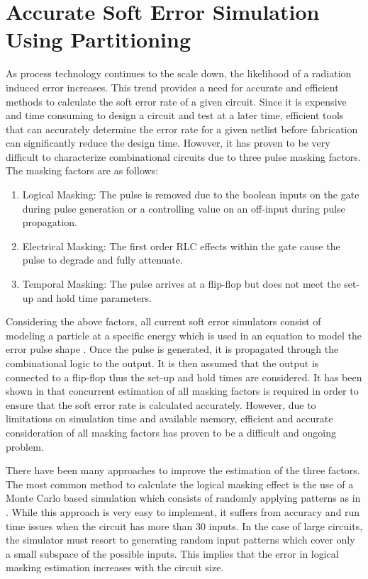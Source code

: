 \chapter{Accurate Soft Error Simulation Using Partitioning} \label{ch3}

As process technology continues to the scale down, the likelihood of a radiation induced error increases. This trend provides a need for accurate and efficient methods to calculate the soft error rate of a given circuit. Since it is expensive and time consuming to design a circuit and test at a later time, efficient tools that can accurately determine the error rate for a given netlist before fabrication can significantly reduce the design time. However, it has proven to be very difficult to characterize combinational circuits due to three pulse masking factors. The masking factors are as follows:

\begin{enumerate}
	\item Logical Masking: The pulse is removed due to the boolean inputs on the gate during pulse generation or a controlling value on an off-input during pulse propagation.
	
	\item Electrical Masking: The first order RLC effects within the gate cause the pulse to degrade and fully attenuate.
	
	\item Temporal Masking: The pulse arrives at a flip-flop but does not meet the set-up and hold time parameters. 
\end{enumerate}

Considering the above factors, all current soft error simulators consist of modeling a particle at a specific energy which is used in an equation to model the error pulse shape \cite{injeq}. Once the pulse is generated, it is propagated through the combinational logic to the output. It is then assumed that the output is connected to a flip-flop thus the set-up and hold times are considered. It has been shown in \cite{MARS_C,METSys} that concurrent estimation of all masking factors is required in order to ensure that the soft error rate is calculated accurately. However, due to limitations on simulation time and available memory, efficient and accurate consideration of all masking factors has proven to be a difficult and ongoing problem. 

There have been many approaches to improve the estimation of the three factors. The most common method to calculate the logical masking effect is the use of a Monte Carlo based simulation which consists of randomly applying patterns as in \cite{Accurate_Masking,SERA,SEMM,PARAM_DESC,SETA_LA}. While this approach is very easy to implement, it suffers from accuracy and run time issues when the circuit has more than 30 inputs. In the case of large circuits, the simulator must resort to generating random input patterns which cover only a small subspace of the possible inputs. This implies that the error in logical masking estimation increases with the circuit size. 


